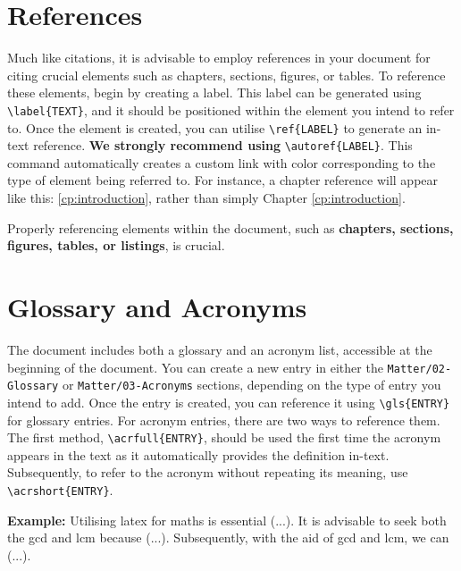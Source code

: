 \section{References}
Much like citations, it is advisable to employ references in your document for citing crucial elements such as chapters, sections, figures, or tables. To reference these elements, begin by creating a label. This label can be generated using \verb|\label{TEXT}|, and it should be positioned within the element you intend to refer to. Once the element is created, you can utilise \verb|\ref{LABEL}| to generate an in-text reference. \textbf{We strongly recommend using} \verb|\autoref{LABEL}|. This command automatically creates a custom link with color corresponding to the type of element being referred to. For instance, a chapter reference will appear like this: \autoref{cp:introduction}, rather than simply Chapter \ref{cp:introduction}. 

\begin{block}[tip]
Properly referencing elements within the document, such as \textbf{chapters, sections, figures, tables, or listings}, is crucial.
\end{block}

\section{Glossary and Acronyms}
The document includes both a glossary and an acronym list, accessible at the beginning of the document. You can create a new entry in either the \verb|Matter/02-Glossary| or \verb|Matter/03-Acronyms| sections, depending on the type of entry you intend to add. Once the entry is created, you can reference it using \verb|\gls{ENTRY}| for glossary entries. For acronym entries, there are two ways to reference them. The first method, \verb|\acrfull{ENTRY}|, should be used the first time the acronym appears in the text as it automatically provides the definition in-text. Subsequently, to refer to the acronym without repeating its meaning, use \verb|\acrshort{ENTRY}|.

\vspace{.875em}
\noindent\textbf{Example:} Utilising \Gls{latex} for \Gls{maths} is essential (...). It is advisable to seek both the \acrfull{gcd} and \acrfull{lcm} because (...). Subsequently, with the aid of \acrshort{gcd} and \acrshort{lcm}, we can (...).

